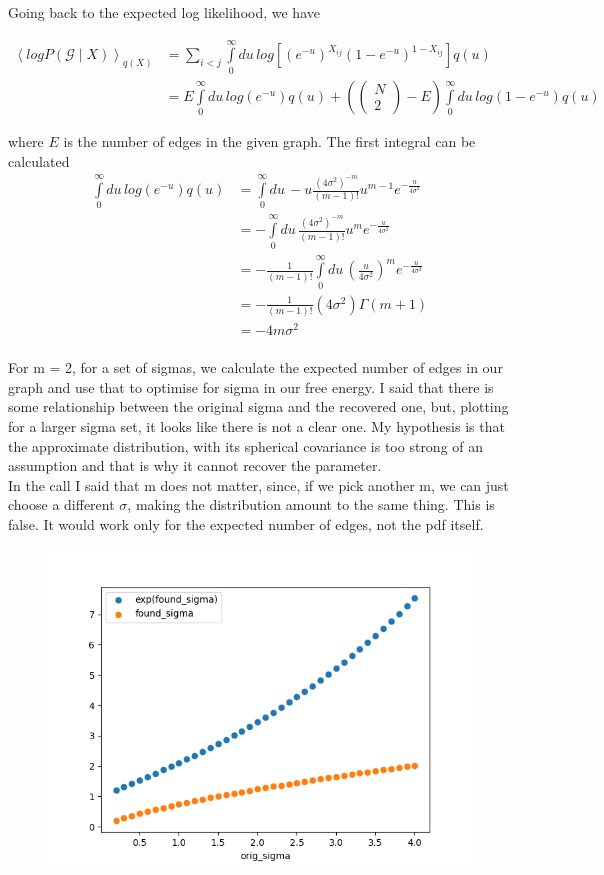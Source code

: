 \documentclass{article}
\newcommand{\mc}[1]{\mathcal{#1}}
\newcommand{\intlim}[2]{\int\limits_{#1}^{#2}}
\begin{document}
\noindent
Going back to the expected log likelihood, we have

\begin{align*}
    \left<logP(\mc{G}\mid X)\right>_{q(X)} &=\sum\limits_{i < j}\intlim{0}{\infty} du\, log\left[(e^{-u})^{X_{ij}}(1 - e^{-u})^{1 - X_{ij}}\right] q(u) \\
    &= E \intlim{0}{\infty} du\, log(e^{-u})q(u) + \left(\begin{pmatrix} N \\ 2 \end{pmatrix} - E\right)\intlim{0}{\infty} du\, log(1 - e^{-u})q(u)
\end{align*}

\noindent
where $E$ is the number of edges in the given graph. The first integral can be calculated \\


\begin{align*}
    \intlim{0}{\infty} du\, log(e^{-u})q(u) &= \intlim{0}{\infty} du\, -u \frac{(4\sigma^2)^{-m}}{(m - 1)!} u^{m - 1}e^{-\frac{u}{4\sigma^2}} \\
    &= -\intlim{0}{\infty} du\, \frac{(4\sigma^2)^{-m}}{(m - 1)!} u^{m}e^{-\frac{u}{4\sigma^2}} \\
    &= -\frac{1}{(m - 1)!}\intlim{0}{\infty} du\, \left(\frac{u}{4\sigma^2}\right)^{m} e^{-\frac{u}{4\sigma^2}} \\
    &= -\frac{1}{(m - 1)!} (4\sigma^2)\Gamma(m + 1) \\
    &= -4m\sigma^2 \\
\end{align*}

\noindent
For m = 2, for a set of sigmas, we calculate the expected number of edges in our graph and use that to optimise for sigma in our free energy. I said that there is some relationship between the original sigma and the recovered one, but, plotting for a larger sigma set, it looks like there is not a clear one. My hypothesis is that the approximate distribution, with its spherical covariance is too strong of an assumption and that is why it cannot recover the parameter. \\

\noindent
In the call I said that m does not matter, since, if we pick another m, we can just choose a different $\sigma$, making the distribution amount to the same thing. This is false. It would work only for the expected number of edges, not the pdf itself.


\begin{figure}[ht]
    \includegraphics{orig_sigma_vs_found_sigma.png}
\end{figure}
\end{document}
